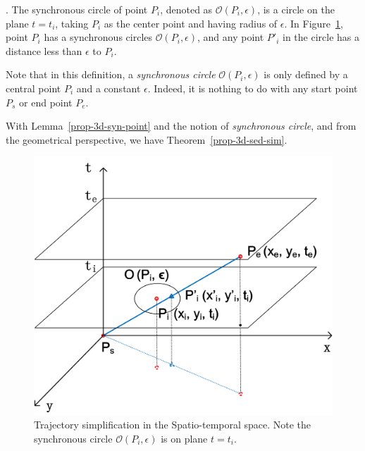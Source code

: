 . The synchronous circle of point $P_i$, denoted as $\mathcal{O}(P_i, \epsilon)$, is a circle on the plane $t=t_i$, taking $P_i$ as the center point and having radius of $\epsilon$. %
In Figure~\ref{fig:sed3d}, \eg point $P_i$ has a synchronous circles $\mathcal{O}(P_i, \epsilon)$, and any point $P'_i$ in the circle has a distance less than $\epsilon$ to $P_i$.

Note that in this definition, a \emph{synchronous circle} $\mathcal{O}(P_i, \epsilon)$ is only defined by a central point $P_i$ and a constant $\epsilon$. Indeed, it is nothing to do with any start point $P_s$ or end point $P_e$.

With Lemma~\ref{prop-3d-syn-point} and the notion of \emph{synchronous circle}, and from the geometrical perspective, we have Theorem~\ref{prop-3d-sed-sim}.

\begin{figure}[tb!]
\centering
\includegraphics[scale=0.56]{figures/Fig-SEDin3D.png}
\vspace{-1ex}
\caption{\small Trajectory simplification in the Spatio-temporal space. Note the synchronous circle $\mathcal{O}(P_i, \epsilon)$ is on plane $t=t_i$.} %
\vspace{-3ex}
\label{fig:sed3d}
\end{figure}


